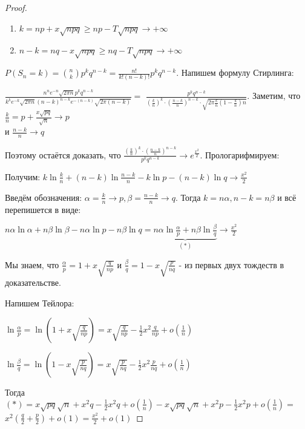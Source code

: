 \begin{proof}
    \hfill \smallbreak
    \begin{enumerate}
        \item {
            $k = np + x\sqrt{npq} \geqslant np - T\sqrt{npq} \rightarrow +\infty$
        }
        \item {
            $n - k = nq - x\sqrt{npq} \geqslant nq - T\sqrt{npq} \rightarrow +\infty$
        }
    \end{enumerate}

    $P(S_n = k) = \binom{n}{k} p^k q^{n - k} = \frac{n!}{k!(n - k)!}p^k q^{n - k}$. Напишем формулу Стирлинга:

    $\frac{n^n e^{-n} \sqrt{2\pi n}p^kq^{n-k}}{k^ke^{-k}\sqrt{2\pi n} (n-k)^{n - k} e^{-(n - k)} \sqrt{2 \pi (n - k)}} =$
    $\frac{p^k q^{n - k}}{(\frac{k}{n})^k \cdot (\frac{n - k}{n})^{n - k} \cdot \sqrt{2 \pi \frac{k}{n} (1 - \frac{k}{n})n}}$.
    Заметим, что $\frac{k}{n} = p + \frac{x\sqrt{pq}}{\sqrt{n}} \rightarrow p$ \\ и $\frac{n - k}{n} \rightarrow q$

    Поэтому остаётся доказать, что $\frac{(\frac{k}{n})^k \cdot (\frac{n - k}{n})^{n - k}}{p^k q^{n - k}} \rightarrow e^{\frac{x^2}{2}}$. Прологарифмируем:

    Получим: $k \ln \frac{k}{n} + (n - k) \ln \frac{n - k}{n} - k \ln p - (n - k)\ln q \rightarrow \frac{x^2}{2}$
    
    Введём обозначения: $\alpha = \frac{k}{n} \rightarrow p, \beta = \frac{n - k}{n} \rightarrow q$. Тогда $k = n\alpha, n - k = n\beta$ и всё перепишется в виде:

    $n \alpha \ln \alpha + n \beta \ln \beta - n\alpha \ln p - n\beta \ln q = \underbrace{n\alpha \ln \frac{\alpha}{p} + n \beta \ln \frac{\beta}{q}}_{(*)} \rightarrow \frac{x^2}{2}$

    Мы знаем, что $\frac{\alpha}{p} = 1 + x\sqrt{\frac{q}{np}}$ и $\frac{\beta}{q} = 1 - x\sqrt{\frac{p}{nq}}$ - из первых двух тождеств в доказательстве.

    Напишем Тейлора: 

    $\ln \frac{\alpha}{p} = \ln (1 + x\sqrt{\frac{q}{np}}) = x\sqrt{\frac{q}{np}} - \frac{1}{2}x^2\frac{q}{np} + o(\frac{1}{n}) $ 

    $\ln \frac{\beta}{q} = \ln (1 - x\sqrt{\frac{p}{nq}}) = x\sqrt{\frac{p}{nq}} - \frac{1}{2}x^2 \frac{p}{nq} + o(\frac{1}{n})$

    Тогда $(*) = x\sqrt{pq}\sqrt{n} + x^2q - \frac{1}{2}x^2q + o(\frac{1}{n}) - x\sqrt{pq}\sqrt{n} + x^2p - \frac{1}{2}x^2p + o(\frac{1}{n}) = $
    $x^2 (\frac{q}{2} + \frac{p}{2}) + o(1) = \frac{x^2}{2} + o(1)$
\end{proof}

